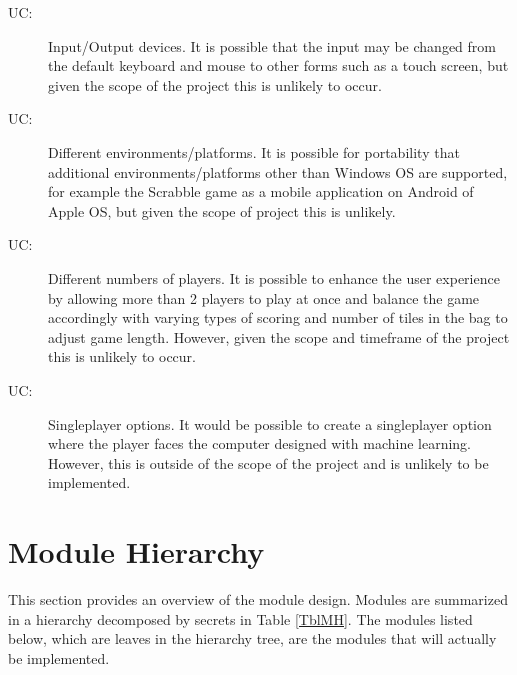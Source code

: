 \documentclass[12pt, titlepage]{article}
\newcounter{ucnum}
\newcommand{\uctheucnum}{UC\theucnum}
\begin{document}
\begin{description}
\item [ \uctheucnum \label{ucIO}:] Input/Output devices. It is possible that the input may be changed from the default keyboard and mouse to other forms such as a touch screen, but given the scope of the project this is unlikely to occur.
\item [ \uctheucnum \label{ucEnviro}:] Different environments/platforms. It is possible for portability that additional environments/platforms other than Windows OS are supported, for example the Scrabble game as a mobile application on Android of Apple OS, but given the scope of project this is unlikely.
\item [ \uctheucnum \label{ucNumPlay}:] Different numbers of players. It is possible to enhance the user experience by allowing more than 2 players to play at once and balance the game accordingly with varying types of scoring and number of tiles in the bag to adjust game length. However, given the scope and timeframe of the project this is unlikely to occur.
\item [ \uctheucnum \label{ucSP}:] Singleplayer options. It would be possible to create a singleplayer option where the player faces the computer designed with machine learning. However, this is outside of the scope of the project and is unlikely to be implemented.
\end{description}

\section{Module Hierarchy} \label{SecMH} %

This section provides an overview of the module design. Modules are summarized
in a hierarchy decomposed by secrets in Table \ref{TblMH}. The modules listed
below, which are leaves in the hierarchy tree, are the modules that will
actually be implemented.
\end{document}
